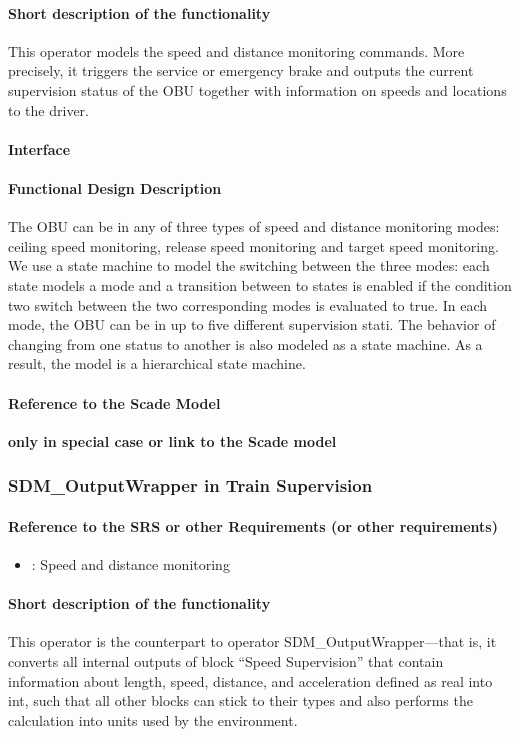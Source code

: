 \paragraph{Short description of the functionality}
This operator models the speed and distance monitoring commands. More precisely, it triggers the service or emergency brake and outputs the current supervision status of the OBU together with information on speeds and locations to the driver.
\paragraph{Interface}
\paragraph{Functional Design Description}
The OBU can be in any of three types of speed and distance monitoring modes: ceiling speed monitoring, release speed monitoring and target speed monitoring. We use a state machine to model the switching between the three modes: each state models a mode and a transition between to states is enabled if the condition two switch between the two corresponding modes is evaluated to true. In each mode, the OBU can be in up to five different supervision stati. The behavior of changing from one status to another is also modeled as a state machine. As a result, the model is a hierarchical state machine.
\paragraph{Reference to the Scade Model}
\textbf{only in special case or link to the Scade model}

\subsubsection{SDM\_OutputWrapper in Train Supervision}
\paragraph{Reference to the SRS or other Requirements (or other requirements)}
\begin{itemize}
	\item \cite[Chapt.~3.13]{subset-026}: Speed and distance monitoring 
\end{itemize}

\paragraph{Short description of the functionality}
This operator is the counterpart to operator SDM\_OutputWrapper---that is, it converts all internal outputs of block ``Speed Supervision'' that contain information about length, speed, distance, and acceleration defined as real into int, such that all other blocks can stick to their types and also performs the calculation into units used by the environment.

